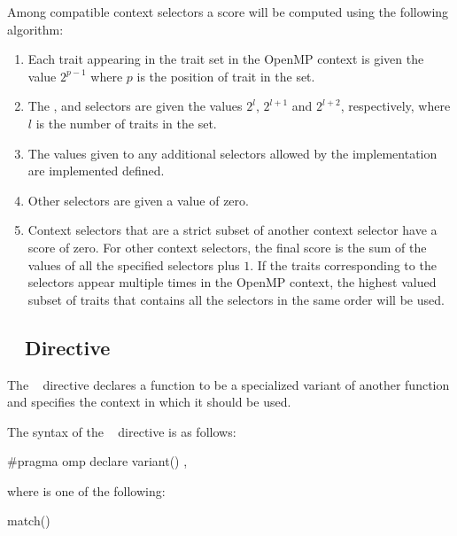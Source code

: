 Among compatible context selectors a score will be computed using the following algorithm:
\begin{enumerate}
 \item Each trait appearing in the  trait set in the OpenMP context is given the value $2^{p-1}$ where $p$ is the position of trait in the set.
 \item The ,  and  selectors are given the
     values $2^{l}$, $2^{l+1}$ and $2^{l+2}$, respectively, where $l$ is the number of traits in the  set.
 \item The values given to any additional selectors allowed by the implementation are implemented defined.
 \item Other selectors are given a value of zero.
 \item Context selectors that are a strict subset of another context selector
     have a score of zero. For other context selectors, the final score is the
     sum of the values of all the specified selectors plus $1$. If the traits
     corresponding to the  selectors appear multiple times in the OpenMP context, the highest valued subset of traits that contains all the selectors in the same order will be used.
\end{enumerate}

\subsection{~ Directive}
\label{subsec:declare variant Directive}
\summary
The ~ directive declares a function to be a
specialized variant of another function and specifies the context in which it
should be used.

\syntax
\begin{ccppspecific}
\begin{samepage}
The syntax of the ~ directive is as follows:

\begin{ompcPragma}
#pragma omp declare variant() \plc{[clause[ [},\plc{] clause] ... ] new-line}
\end{ompcPragma}
\end{samepage}

\begin{samepage}
where  is one of the following{}:

\begin{indentedcodelist}
match()
\end{indentedcodelist}
\end{samepage}
\end{ccppspecific}


